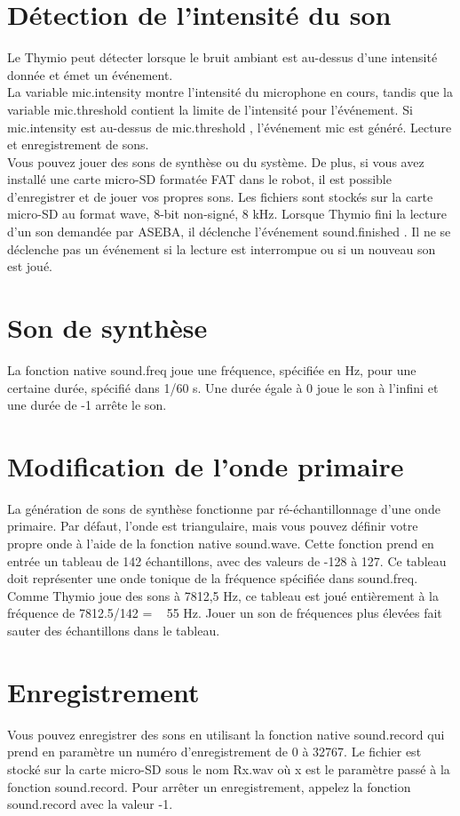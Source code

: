 \documentclass[a4paper, 12pt]{report}
\begin{document}
\section{Détection de l'intensité du son}
Le Thymio peut détecter lorsque le bruit ambiant est au-dessus d'une intensité donnée et émet un événement.\\
La variable mic.intensity montre l'intensité du microphone en cours, tandis que la variable mic.threshold contient la limite de l'intensité pour l'événement. Si mic.intensity est au-dessus de mic.threshold , l'événement mic est généré.
Lecture et enregistrement de sons.\\
Vous pouvez jouer des sons de synthèse ou du système. De plus, si vous avez installé une carte micro-SD formatée FAT dans le robot, il est possible d'enregistrer et de jouer vos propres sons. Les fichiers sont stockés sur la carte micro-SD au format wave, 8-bit non-signé, 8 kHz. Lorsque Thymio fini la lecture d'un son demandée par ASEBA, il déclenche l'événement sound.finished . Il ne se déclenche pas un événement si la lecture est interrompue ou si un nouveau son est joué.\\
\section{Son de synthèse}
La fonction native sound.freq joue une fréquence, spécifiée en Hz, pour une certaine durée, spécifié dans 1/60 s. Une durée égale à 0 joue le son à l'infini et une durée de -1 arrête le son.
\section{Modification de l'onde primaire}
La génération de sons de synthèse fonctionne par ré-échantillonnage d'une onde primaire. Par défaut, l'onde est triangulaire, mais vous pouvez définir votre propre onde à l'aide de la fonction native sound.wave. Cette fonction prend en entrée un tableau de 142 échantillons, avec des valeurs de -128 à 127. Ce tableau doit représenter une onde tonique de la fréquence spécifiée dans sound.freq. Comme Thymio joue des sons à 7812,5 Hz, ce tableau est joué entièrement à la fréquence de 7812.5/142 = ~ 55 Hz. Jouer un son de fréquences plus élevées fait sauter des échantillons dans le tableau.
\section{Enregistrement}
Vous pouvez enregistrer des sons en utilisant la fonction native sound.record qui prend en paramètre un numéro d'enregistrement de 0 à 32767. Le fichier est stocké sur la carte micro-SD sous le nom Rx.wav où x est le paramètre passé à la fonction sound.record. Pour arrêter un enregistrement, appelez la fonction sound.record avec la valeur -1.
\end{document}
